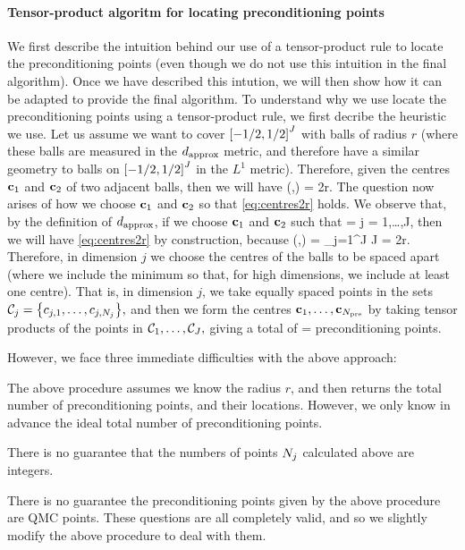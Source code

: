 \paragraph{Tensor-product algoritm for locating preconditioning points} We first describe the intuition behind our use of a tensor-product rule to locate the preconditioning points (even though we do not use this intuition in the final algorithm). Once we have described this intution, we will then show how it can be adapted to provide the final algorithm. To understand why we use locate the preconditioning points using a tensor-product rule, we first decribe the heuristic we use. Let us assume we want to cover $\cube{J}$ with balls of radius $r$ (where these balls are measured in the $d_{\mathrm{approx}}$ metric, and therefore have a similar geometry to balls on $\cube{J}$ in the $L^1$ metric). Therefore, given the centres $\mathbf{c}_{1}$ and $\mathbf{c}_{2}$ of two adjacent balls, then we will have
\beq\label{eq:centres2r}
\dapprox(\bcone,\bct) = 2r.
\eeq
The question now arises of how we choose $\mathbf{c}_{1}$ and $\mathbf{c}_{2}$ so that \cref{eq:centres2r} holds. We observe that, by the definition of $d_{\mathrm{approx}}$, if we choose $\mathbf{c}_{1}$ and $\mathbf{c}_{2}$ such that
\beqs
\sqrt{\lambdaj} =  \tforall j = 1,\ldots,J,
\eeqs
then we will have \cref{eq:centres2r} by construction, because
\beqs
\dapprox(\bcone,\bct) = \sum_{j=1}^J J = 2r.
\eeqs
Therefore, in dimension $j$ we choose the centres of the balls to be spaced
\beqs
\min{}
\eeqs
apart (where we include the minimum so that, for high dimensions, we include at least one centre). That is, in dimension $j$, we take
\beq\label{eq:Nj}
\Nj \de \max{}
\eeq
equally spaced points in the sets $\centresj = \set{c_{j,1},\ldots,c_{j,\Nj}},$ and then we form the centres $\mathbf{c}_{1},\ldots,\mathbf{c}_{N_{\mathrm{pre}}}$ by taking tensor products of the points in $\mathcal C_{1},\ldots,\mathcal C_{J},$ giving a total of
\beq\label{eq:Npre}
\Npre = \No \times \cdots \times \NJ
\eeq
preconditioning points.

However, we face three immediate difficulties with  the above approach:
\ben
\item The above procedure assumes we know the radius $r$, and then returns the total number of preconditioning points, and their locations. However, we only know in advance the ideal total number of preconditioning points.
\item There is no guarantee that the numbers of points $N_{j}$ calculated above are integers.
  \item There is no guarantee the preconditioning points given by the above procedure are QMC points.
    \een
    These questions are all completely valid, and so we slightly modify the above procedure to deal with them.

